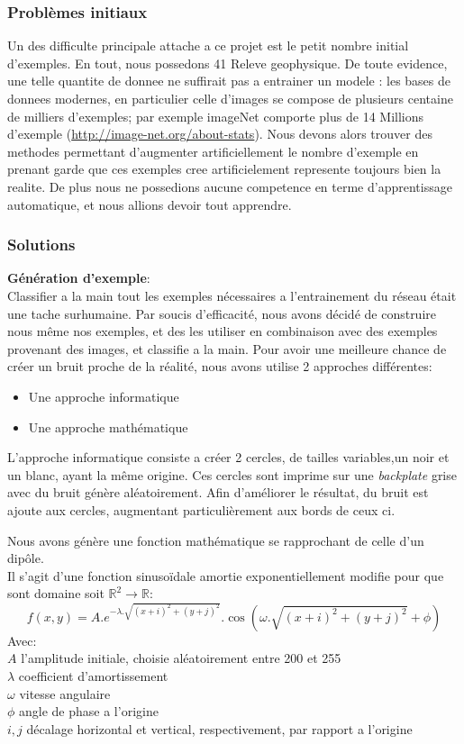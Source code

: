 \documentclass[a4paper, 12pt, titlepage, oneside, french]{article}
\begin{document}
	\subsubsection{Problèmes initiaux}
	Un des difficulte principale attache a ce projet est le petit nombre initial d'exemples. En tout, nous possedons 41 Releve geophysique. De toute evidence, une telle quantite de donnee ne suffirait pas a entrainer un modele : les bases de donnees modernes, en particulier celle d'images se compose de plusieurs centaine de milliers d'exemples; par exemple imageNet comporte plus de 14 Millions d'exemple (\url{http://image-net.org/about-stats}). Nous devons alors trouver des methodes permettant d'augmenter artificiellement le nombre d'exemple en prenant garde que ces exemples cree artificielement represente toujours bien la realite. De plus nous ne possedions aucune competence en terme d'apprentissage automatique, et nous allions devoir tout apprendre. 
	\subsubsection{Solutions}
	\textbf{Génération d'exemple}:\\
	Classifier a la main tout les exemples nécessaires a l'entrainement du réseau était une tache surhumaine. Par soucis d'efficacité, nous avons décidé de construire nous même
	nos exemples, et des les utiliser en combinaison avec des exemples provenant des images, et classifie a la main.
	Pour avoir une meilleure chance de créer un bruit proche de la réalité, nous avons utilise 2 approches différentes:
	\begin{itemize}
		\item Une approche informatique
		\item Une approche mathématique
	\end{itemize}
	L'approche informatique consiste a créer 2 cercles, de tailles variables,un noir et un blanc, ayant la même origine. Ces cercles sont imprime sur une \textit{backplate} grise avec du bruit génère aléatoirement. Afin d'améliorer le résultat, du bruit est ajoute aux cercles, augmentant particulièrement aux bords de ceux ci.

	Nous avons génère une fonction mathématique se rapprochant de celle d'un dipôle.\\
	Il s'agit d'une fonction sinusoïdale amortie exponentiellement modifie pour que sont domaine soit $\mathbb{R}^2 \to \mathbb{R}$:
	\[f(x,y) = A.e^{-\lambda . \sqrt{(x+i)^2+(y+j)^2}}.\cos(\omega . \sqrt{(x+i)^2+(y+j)^2} + \phi)\]
	Avec:\\
	\indent $A$ l'amplitude initiale, choisie aléatoirement entre 200 et 255\\
	\indent$\lambda$ coefficient d'amortissement\\
	\indent$\omega$ vitesse angulaire\\
	\indent$\phi$ angle de phase a l'origine\\
	\indent$i,j$ décalage horizontal et vertical, respectivement, par rapport a l'origine
\end{document}
